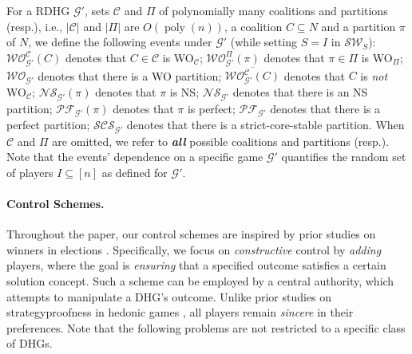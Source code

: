 \documentclass[letterpaper]{article}
\DeclareMathOperator*{\poly}{poly}
\begin{document}
For a RDHG $\mathcal{G}'$, sets $\mathcal{C}$ and $\Pi$ of polynomially many coalitions and partitions (resp.), i.e., $|\mathcal{C}|$ and $|\Pi|$ are $O(\poly(n))$, a coalition $C \subseteq N$ and a partition $\pi$ of $N$, we define the following events under $\mathcal{G}'$ (while setting $S=I$ in $\mathcal{SW}_S$): %
$\mathcal{WO}_{\mathcal{G}'}^{\mathcal{C}}(C)$ denotes that $C \in \mathcal{C}$ is WO$_\mathcal{C}$; $\mathcal{WO}_{\mathcal{G}'}^{\Pi}(\pi)$ denotes that $\pi \in \Pi$ is WO$_\Pi$; $\mathcal{WO}_{\mathcal{G}'}$ denotes that there is a WO partition; $\overline{\mathcal{WO}^{\mathcal{C}}_{\mathcal{G}'}(C)}$ denotes that $C$ is \textit{not} WO$_\mathcal{C}$; %
$\mathcal{NS}_{\mathcal{G}'}(\pi)$ denotes that $\pi$ is NS; $\mathcal{NS}_{\mathcal{G}'}$ denotes that there is an NS partition; $\mathcal{PF}_{\mathcal{G}'}(\pi)$ denotes that $\pi$ is perfect; $\mathcal{PF}_{\mathcal{G}'}$ denotes that there is a perfect partition; %
$\mathcal{SCS}_{\mathcal{G}'}$ denotes that there is a strict-core-stable partition. When $\mathcal{C}$ and $\Pi$ are omitted, we refer to \textbf{\textit{all}} possible coalitions and partitions (resp.). Note that the events' dependence on a specific game $\mathcal{G}'$ quantifies the random set of players $I \subseteq [n]$ as defined for $\mathcal{G}'$.





\paragraph{Control Schemes.} Throughout the paper, our control schemes are inspired by prior studies on winners in elections \cite{bartholdi1992hard,hemaspaandra2007anyone,wojtas2012possible}. Specifically, we focus on \textit{constructive} control by \textit{adding} players, where the goal is \textit{ensuring} that a specified outcome satisfies a certain solution concept. Such a scheme can be employed by a central authority, which attempts to manipulate a DHG's outcome. Unlike prior studies on strategyproofness in hedonic games \cite{flammini2021strategyproof}, all players remain \textit{sincere} in their preferences. Note that the following problems are not restricted to a specific class of DHGs.
\end{document}
